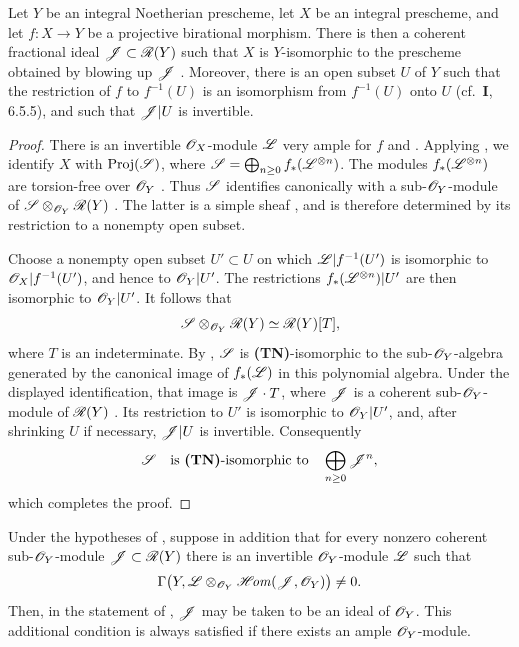 \begin{proposition}[2.3.5]
\label{III.2.3.5}
Let $Y$ be an integral Noetherian prescheme, let $X$ be an integral prescheme, and let $f:X\longrightarrow Y$
be a \textup{projective birational} morphism.
There is then a coherent fractional ideal $\mathscr{J}\subset\mathscr{R}(Y)$
 such that $X$ is $Y$-isomorphic to the prescheme obtained by blowing up $\mathscr{J}$ .
Moreover, there is an open subset $U$ of $Y$ such that the restriction of $f$ to $f^{-1}(U)$ is an isomorphism from $f^{-1}(U)$ onto $U$ (cf.\ \textbf{I}, 6.5.5), and such that $\mathscr{J}|U$ is invertible.
\end{proposition}

\begin{proof}
There is an invertible $\mathscr{O}_X$-module $\mathscr{L}$ very ample for $f$  and .
Applying , we identify $X$ with $\operatorname{Proj}(\mathscr{S})$, where $\mathscr{S}=\bigoplus_{n\geq0}f_*(\mathscr{L}^{\otimes n})$.
The modules $f_*(\mathscr{L}^{\otimes n})$ are torsion-free over $\mathscr{O}_Y$ .
Thus $\mathscr{S}$ identifies canonically with a sub-$\mathscr{O}_Y$-module of $\mathscr{S}\otimes_{\mathscr{O}_Y}\mathscr{R}(Y)$
.
The latter is a simple sheaf , and is therefore determined by its restriction to a nonempty open subset.

Choose a nonempty open subset $U'\subset U$ on which $\mathscr{L}|f^{-1}(U')$ is isomorphic to $\mathscr{O}_X|f^{-1}(U')$, and hence to $\mathscr{O}_Y|U'$.
The restrictions $f_*(\mathscr{L}^{\otimes n})|U'$ are then isomorphic to $\mathscr{O}_Y|U'$.
It follows that
\[
  \mathscr{S}\otimes_{\mathscr{O}_Y}\mathscr{R}(Y)
  \simeq\mathscr{R}(Y)[T],
\]
where $T$ is an indeterminate.
By , $\mathscr{S}$ is \textbf{(TN)}-isomorphic to the sub-$\mathscr{O}_Y$-algebra generated by the canonical image of $f_*(\mathscr{L})$ in this polynomial algebra.
Under the displayed identification, that image is $\mathscr{J}\cdot T$, where $\mathscr{J}$ is a coherent sub-$\mathscr{O}_Y$-module of $\mathscr{R}(Y)$ .
Its restriction to $U'$ is isomorphic to $\mathscr{O}_Y|U'$, and, after shrinking $U$ if necessary, $\mathscr{J}|U$ is invertible.
Consequently
\[
  \mathscr{S}\quad\text{is \textbf{(TN)}-isomorphic to}\quad
  \bigoplus_{n\geq0}\mathscr{J}^n,
\]
which completes the proof.
\end{proof}

\begin{corollary}[2.3.6]
\label{III.2.3.6}
Under the hypotheses of , suppose in addition that for every nonzero coherent sub-$\mathscr{O}_Y$-module $\mathscr{J}\subset\mathscr{R}(Y)$
there is an invertible $\mathscr{O}_Y$-module $\mathscr{L}$ such that
\[
  \Gamma\bigl(Y,\mathscr{L}\otimes_{\mathscr{O}_Y}
  \mathscr{H}\!\mathit{om}(\mathscr{J},\mathscr{O}_Y)\bigr)\neq0.
\]
Then, in the statement of , $\mathscr{J}$ may be taken to be an ideal of $\mathscr{O}_Y$.
This additional condition is always satisfied if there exists an ample $\mathscr{O}_Y$-module.
\end{corollary}

